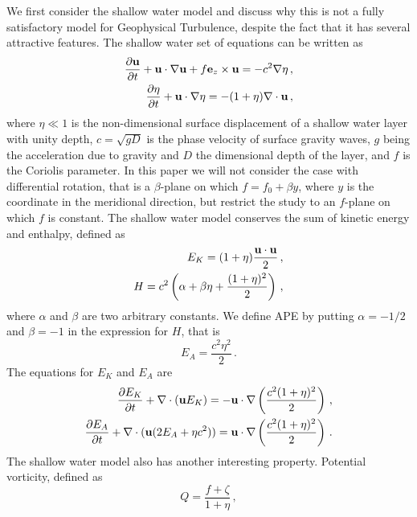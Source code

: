 We first consider the shallow water model \citep{Vallis:book} and discuss why this  is not a fully satisfactory model for Geophysical Turbulence, despite the fact that it has several attractive features. The shallow water set of equations can be written as
\begin{eqnarray} \label{Velocity}
\frac{\partial {\bf u}} {\partial t} + {\bf u} \cdot \nabla {\bf u} +  f {\bf e}_z \times {\bf u} = -c^2 \nabla \eta \, , \\ \label {Eta}
\frac{\partial \eta}{\partial t}
+ {\bf u} \cdot \nabla \eta   = - (1+\eta) \nabla \cdot {\bf u} \, ,
\end{eqnarray}
where $ \eta \ll 1 $ is the non-dimensional surface displacement of a shallow water layer with unity depth, $ c = \sqrt{gD} $ is the phase velocity of surface gravity waves, $ g $ being the acceleration due to gravity and $ D $ the dimensional depth of the layer, and $ f  $ is the Coriolis parameter. In this paper we will not consider the case with differential rotation, that is a $ \beta $-plane on which $ f = f_{0} + \beta y $, where  $ y $ is the coordinate in the meridional direction, but restrict the study to an $ f $-plane on which $ f $ is constant. 
The shallow water model conserves the sum of kinetic energy and enthalpy, defined as 
\begin{eqnarray}
E_K = (1+\eta) \frac{{\bf u} \cdot {\bf u}}{2} \, , \\  \label{potential}
H = c^{2} \left (\alpha + \beta \eta  + \frac{(1+\eta)^2 }{2} \right) \, ,
\end{eqnarray} 
where $ \alpha $ and $ \beta $ are two arbitrary constants. 
We define APE by putting $  \alpha = -1/2 $ and $ \beta = - 1 $  in the expression for $ H $, that is
 \begin{equation}
E_{A} = \frac{c^2  \eta^{2} }{2} \, .
\end{equation}
The equations for $ E_K $ and $ E_A $ are
\begin{eqnarray} \label{KE}
\frac{\partial{E_K}} {\partial t} + \nabla \cdot ({\bf u}E_K) = -{\bf u} \cdot \nabla \left (\frac{c^2(1+\eta)^2}{2} \right ) \, , \\
\frac{\partial{E_A}} {\partial t} + \nabla \cdot({\bf u} (2E_A + \eta c^{2})) = {\bf u} \cdot \nabla \left (\frac{c^2(1+\eta)^2}{2} \right ) \, .
\end{eqnarray}
The shallow water model also has another interesting property. Potential vorticity, defined as 
\begin{equation} \label{PV}
Q = \frac{f +\zeta }{1+\eta} \, ,
\end{equation}
